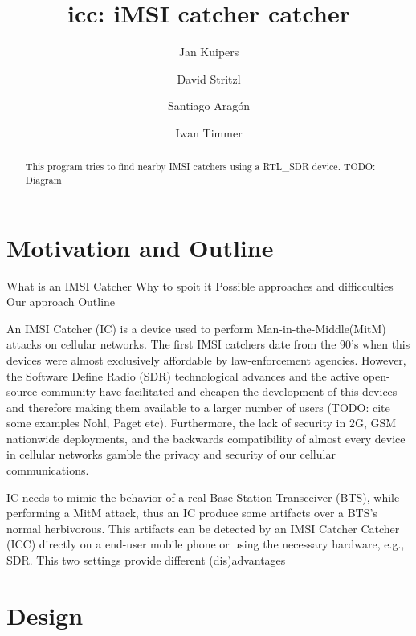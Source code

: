 \documentclass[preprint,12pt,3p]{elsarticle}
\begin{document}
\begin{frontmatter}

\title{icc: iMSI catcher catcher}

\author{Jan Kuipers}
\address{j.h.kuipers@student.utwente.nl}
\author{David Stritzl}
\address{david.stritzl@gmail.com}
\author{Santiago Aragón}
\address{s.e.aragonramirez@student.utwente.nl}
\author{Iwan Timmer}
\address{i.r.timmer@student.utwente.nl}
\address{University of Twente}
\begin{abstract}
This program tries to find nearby IMSI catchers using a RTL\_SDR device. TODO: Diagram
\end{abstract}


\end{frontmatter}





\section{Motivation and Outline}

What is an IMSI Catcher
Why to spoit it
Possible approaches and difficculties
Our approach
Outline


An IMSI Catcher (IC) is a device used to perform Man-in-the-Middle(MitM) attacks on cellular networks. The first IMSI catchers date from the 90's when this devices were almost exclusively affordable by law-enforcement agencies. However, the Software Define Radio (SDR) technological advances and the active open-source community have facilitated and cheapen the development of this devices and therefore making them available to a larger number of users (TODO: cite some examples Nohl, Paget etc). Furthermore, the lack of security in 2G, GSM nationwide deployments, and the backwards compatibility of almost every device in cellular networks gamble the privacy and security of our cellular communications.

IC needs to mimic the behavior of a real Base Station Transceiver (BTS), while performing a MitM attack, thus an IC produce some artifacts over a BTS's normal herbivorous. This artifacts can be detected by an IMSI Catcher Catcher (ICC) directly on a end-user mobile phone or using the necessary hardware, e.g., SDR. This two settings provide different (dis)advantages

\section{Design}
\end{document}
